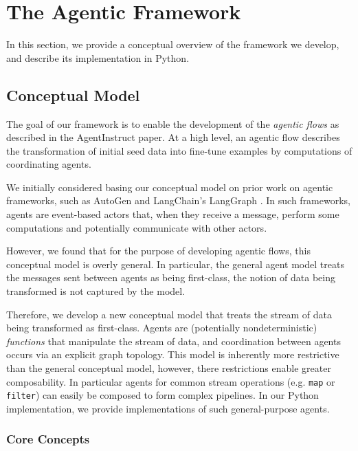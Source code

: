 \section{The Agentic Framework}\label{sec:framework}

In this section, we provide a conceptual overview of the framework we develop,
and describe its implementation in Python.

\subsection{Conceptual Model}

The goal of our framework is to enable the development of the \emph{agentic
flows} as described in the AgentInstruct \citep{mitra_agentinstruct_2024} paper.
At a high level, an agentic flow describes the transformation of initial seed
data into fine-tune examples by computations of coordinating agents.

We initially considered basing our conceptual model on prior work on agentic
frameworks, such as AutoGen \cite{wu2023autogenenablingnextgenllm} and
LangChain's LangGraph \cite{langchain}. In such frameworks, agents are
event-based actors that, when they receive a message, perform some computations
and potentially communicate with other actors.

However, we found that for the purpose of developing agentic flows, this
conceptual model is overly general. In particular, the general agent model
treats the messages sent between agents as being first-class, the notion of data
being transformed is not captured by the model.

Therefore, we develop a new conceptual model that treats the stream of data
being transformed as first-class. Agents are (potentially nondeterministic)
\emph{functions} that manipulate the stream of data, and coordination between
agents occurs via an explicit graph topology. This model is inherently more
restrictive than the general conceptual model, however, there restrictions
enable greater composability. In particular agents for common stream operations
(e.g. \texttt{map} or \texttt{filter}) can easily be composed to form complex
pipelines. In our Python implementation, we provide implementations of such
general-purpose agents.

\subsubsection{Core Concepts}

